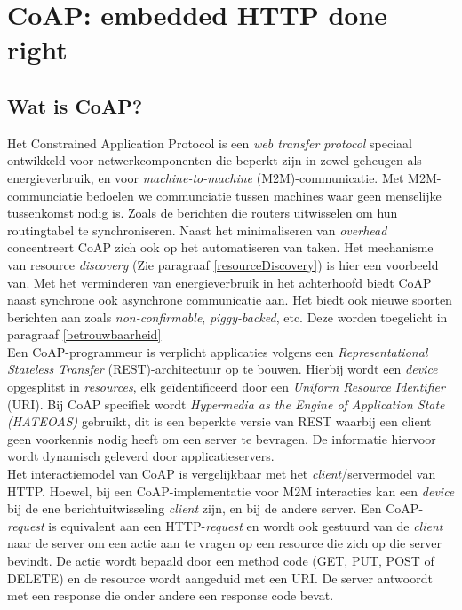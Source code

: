 \chapter{CoAP: embedded HTTP done right} \label{CoAP}

\section{Wat is CoAP?}

Het Constrained Application Protocol is een \textit{web transfer protocol} speciaal ontwikkeld voor netwerkcomponenten die beperkt zijn in zowel geheugen als energieverbruik, en voor \textit{machine-to-machine} (M2M)-communicatie. Met M2M-communciatie bedoelen we communciatie tussen machines waar geen menselijke tussenkomst nodig is. Zoals de berichten die routers uitwisselen om hun routingtabel te synchroniseren. Naast het minimaliseren van \textit{overhead} concentreert CoAP zich ook op het automatiseren van taken. Het mechanisme van resource \textit{discovery} (Zie paragraaf \ref{resourceDiscovery}) is hier een voorbeeld van. Met het verminderen van energieverbruik in het achterhoofd biedt CoAP naast synchrone ook asynchrone communicatie aan. Het biedt ook nieuwe soorten berichten aan zoals \textit{non-confirmable}, \textit{piggy-backed}, etc. Deze worden toegelicht in paragraaf \ref{betrouwbaarheid}\\

Een CoAP-programmeur is verplicht applicaties volgens een \textit{Representational Stateless Transfer} (REST)-architectuur op te bouwen. Hierbij wordt een \textit{device} opgesplitst in \textit{resources}, elk ge\"{i}dentificeerd door een \textit{Uniform Resource Identifier} (URI). Bij CoAP specifiek wordt \textit{Hypermedia as the Engine of Application State (HATEOAS)} gebruikt, dit is een beperkte versie van REST waarbij een client geen voorkennis nodig heeft om een server te bevragen. De informatie hiervoor wordt dynamisch geleverd door applicatieservers.\\

Het interactiemodel van CoAP is vergelijkbaar met het \textit{client}/servermodel van HTTP. Hoewel, bij een CoAP-implementatie voor M2M interacties kan een \textit{device} bij de ene berichtuitwisseling \textit{client} zijn, en bij de andere server. Een CoAP-\textit{request} is equivalent aan een HTTP-\textit{request} en wordt ook gestuurd van de \textit{client} naar de server om een actie aan te vragen op een resource die zich op die server bevindt. De actie wordt bepaald door een method code (GET, PUT, POST of DELETE) en de resource wordt aangeduid met een URI. De server antwoordt met een response die onder andere een response code bevat.\\

